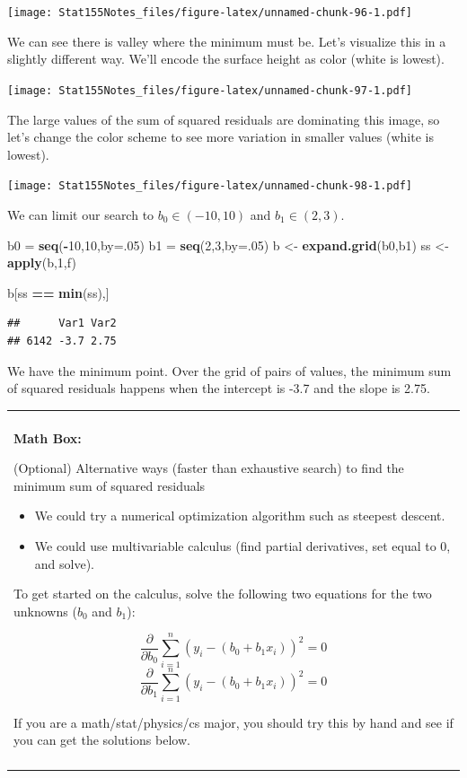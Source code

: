 \documentclass[]{book}
\newenvironment{Shaded}{\begin{snugshade}}{\end{snugshade}}
\newcommand{\DataTypeTok}[1]{\textcolor[rgb]{0.13,0.29,0.53}{#1}}
\newcommand{\DecValTok}[1]{\textcolor[rgb]{0.00,0.00,0.81}{#1}}
\newcommand{\KeywordTok}[1]{\textcolor[rgb]{0.13,0.29,0.53}{\textbf{#1}}}
\newcommand{\NormalTok}[1]{#1}
\newcommand{\OperatorTok}[1]{\textcolor[rgb]{0.81,0.36,0.00}{\textbf{#1}}}
\newcommand{\StringTok}[1]{\textcolor[rgb]{0.31,0.60,0.02}{#1}}
\providecommand{\tightlist}{%
  \setlength{\itemsep}{0pt}\setlength{\parskip}{0pt}}
\newenvironment{mathbox}
{
    \begin{center}
    
    \begin{tabular}{|p{0.8\textwidth}|}
    \rowcolor{LightYellow}
    \hline\\
    \rowcolor{LightYellow}
    \textbf{Math Box:}
}
{
    \\\rowcolor{LightYellow}
    \\\hline
    \end{tabular} 
    \end{center}
}
\begin{document}
\texttt{[image: Stat155Notes\_files/figure-latex/unnamed-chunk-96-1.pdf]}

We can see there is valley where the minimum must be. Let's visualize this in a slightly different way. We'll encode the surface height as color (white is lowest).

\texttt{[image: Stat155Notes\_files/figure-latex/unnamed-chunk-97-1.pdf]}

The large values of the sum of squared residuals are dominating this image, so let's change the color scheme to see more variation in smaller values (white is lowest).

\texttt{[image: Stat155Notes\_files/figure-latex/unnamed-chunk-98-1.pdf]}

We can limit our search to \(b_0 \in (-10,10)\) and \(b_1 \in (2,3)\).

\begin{Shaded}
\begin{Highlighting}[]
\NormalTok{b0 =}\StringTok{ }\KeywordTok{seq}\NormalTok{(}\OperatorTok{-}\DecValTok{10}\NormalTok{,}\DecValTok{10}\NormalTok{,}\DataTypeTok{by=}\NormalTok{.}\DecValTok{05}\NormalTok{)}
\NormalTok{b1 =}\StringTok{ }\KeywordTok{seq}\NormalTok{(}\DecValTok{2}\NormalTok{,}\DecValTok{3}\NormalTok{,}\DataTypeTok{by=}\NormalTok{.}\DecValTok{05}\NormalTok{)}
\NormalTok{b <-}\StringTok{ }\KeywordTok{expand.grid}\NormalTok{(b0,b1)}
\NormalTok{ss <-}\StringTok{ }\KeywordTok{apply}\NormalTok{(b,}\DecValTok{1}\NormalTok{,f)}

\NormalTok{b[ss }\OperatorTok{==}\StringTok{ }\KeywordTok{min}\NormalTok{(ss),]}
\end{Highlighting}
\end{Shaded}

\begin{verbatim}
##      Var1 Var2
## 6142 -3.7 2.75
\end{verbatim}

We have the minimum point. Over the grid of pairs of values, the minimum sum of squared residuals happens when the intercept is -3.7 and the slope is 2.75.

\begin{mathbox}
(Optional) Alternative ways (faster than exhaustive search) to find the
minimum sum of squared residuals

\begin{itemize}
\tightlist
\item
  We could try a numerical optimization algorithm such as steepest
  descent.
\item
  We could use multivariable calculus (find partial derivatives, set
  equal to 0, and solve).
\end{itemize}

To get started on the calculus, solve the following two equations for
the two unknowns (\(b_0\) and \(b_1\)):

\[\frac{\partial }{\partial b_0}\sum_{i=1}^n (y_i - (b_0 + b_1x_i))^2 = 0\]
\[\frac{\partial }{\partial b_1}\sum_{i=1}^n (y_i - (b_0 + b_1x_i))^2 = 0\]

If you are a math/stat/physics/cs major, you should try this by hand and
see if you can get the solutions below.
\end{mathbox}
\end{document}
